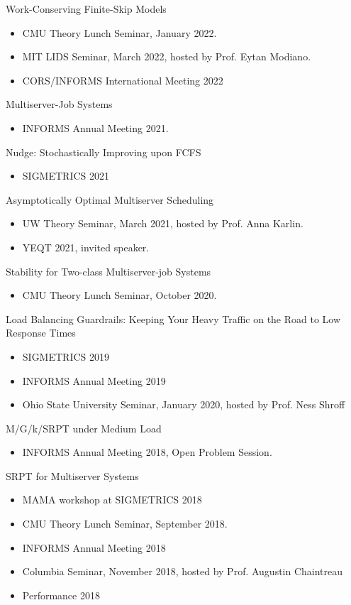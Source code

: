 \documentclass{res}
\begin{document}
\begin{resume}
    Work-Conserving Finite-Skip Models
    \begin{itemize}
        \item CMU Theory Lunch Seminar, January 2022.
        \item MIT LIDS Seminar, March 2022, hosted by Prof. Eytan Modiano.
        \item CORS/INFORMS International Meeting 2022
    \end{itemize}

    Multiserver-Job Systems
    \begin{itemize}
        \item INFORMS Annual Meeting 2021.
    \end{itemize}

    Nudge: Stochastically Improving upon FCFS
    \begin{itemize}
        \item SIGMETRICS 2021 
    \end{itemize}

    Asymptotically Optimal Multiserver Scheduling
    \begin{itemize}
        \item UW Theory Seminar, March 2021, hosted by Prof. Anna Karlin.
        \item YEQT 2021, invited speaker.
    \end{itemize}

    Stability for Two-class Multiserver-job Systems
    \begin{itemize}
        \item CMU Theory Lunch Seminar, October 2020.
    \end{itemize}

    Load Balancing Guardrails: Keeping Your Heavy Traffic on the Road to Low Response Times
    \begin{itemize}
        \item SIGMETRICS 2019
        \item INFORMS Annual Meeting 2019
        \item Ohio State University Seminar, January 2020, hosted by Prof. Ness Shroff
    \end{itemize}

    M/G/k/SRPT under Medium Load
    \begin{itemize}
        \item INFORMS Annual Meeting 2018, Open Problem Session.
    \end{itemize}

    SRPT for Multiserver Systems
    \begin{itemize}
        \item MAMA workshop at SIGMETRICS 2018
        \item CMU Theory Lunch Seminar, September 2018.
        \item INFORMS Annual Meeting 2018
        \item Columbia Seminar, November 2018, hosted by Prof. Augustin Chaintreau
        \item Performance 2018
    \end{itemize}


\end{resume}
\end{document}
